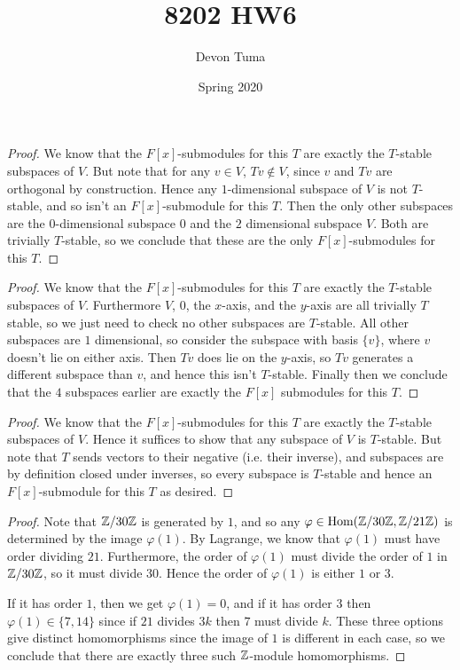 \documentclass[11pt]{article}
\title{8202 HW6}
\author{Devon Tuma}
\date{Spring 2020}
\begin{document}
\maketitle

\begin{proof}
  We know that the $F[x]$-submodules for this $T$ are exactly the $T$-stable subspaces of $V$.
  But note that for any $v \in V$, $Tv \not \in V$, since $v$ and $Tv$ are orthogonal by construction.
  Hence any $1$-dimensional subspace of $V$ is not $T$-stable, and so isn't an $F[x]$-submodule for this $T$.
  Then the only other subspaces are the $0$-dimensional subspace $0$ and the $2$ dimensional subspace $V$.
  Both are trivially $T$-stable, so we conclude that these are the only $F[x]$-submodules for this $T$.
\end{proof}


\begin{proof}
  We know that the $F[x]$-submodules for this $T$ are exactly the $T$-stable subspaces of $V$.
  Furthermore $V$, $0$, the $x$-axis, and the $y$-axis are all trivially $T$ stable, so we just need to check no other subspaces are $T$-stable.
  All other subspaces are $1$ dimensional, so consider the subspace with basis $\{v\}$, where $v$ doesn't lie on either axis.
  Then $Tv$ does lie on the $y$-axis, so $Tv$ generates a different subspace than $v$, and hence this isn't $T$-stable.
  Finally then we conclude that the $4$ subspaces earlier are exactly the $F[x]$ submodules for this $T$.
\end{proof}


\begin{proof}
  We know that the $F[x]$-submodules for this $T$ are exactly the $T$-stable subspaces of $V$.
  Hence it suffices to show that any subspace of $V$ is $T$-stable.
  But note that $T$ sends vectors to their negative (i.e. their inverse), and subspaces are by definition closed under inverses, so every subspace is $T$-stable and hence an $F[x]$-submodule for this $T$ as desired.
\end{proof}


\begin{proof}
  Note that $\mathbb{Z}/30\mathbb{Z}$ is generated by $1$, and so any $\varphi \in \text{Hom}(\mathbb{Z}/30\mathbb{Z}, \mathbb{Z}/21\mathbb{Z})$ is determined by the image $\varphi(1)$.
  By Lagrange, we know that $\varphi(1)$ must have order dividing $21$.
  Furthermore, the order of $\varphi(1)$ must divide the order of $1$ in $\mathbb{Z}/30\mathbb{Z}$, so it must divide $30$.
  Hence the order of $\varphi(1)$ is either $1$ or $3$.

  If it has order $1$, then we get $\varphi(1) = 0$, and if it has order $3$ then $\varphi(1) \in \{7,14\}$ since if $21$ divides $3k$ then $7$ must divide $k$.
  These three options give distinct homomorphisms since the image of $1$ is different in each case, so we conclude that there are exactly three such $\mathbb{Z}$-module homomorphisms.
\end{proof}
\end{document}
